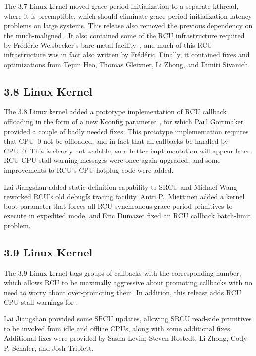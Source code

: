 The 3.7 Linux kernel moved grace-period initialization to a separate
kthread, where it is preemptible, which should eliminate
grace-period-initialization-latency problems on large systems.
This release also removed the previous  dependency
on the much-maligned .
It also contained some of the RCU infrastructure required by
Fr\'ed\'eric Weisbecker's  bare-metal
facility~\cite{JonCorbet2013NO-HZ-FULL}, and much of this RCU
infrastructure was in fact also written by Fr\'ed\'eric.
Finally, it contained fixes and optimizations from Tejun Heo,
Thomas Gleixner, Li Zhong, and Dimiti Sivanich.

\subsection{3.8 Linux Kernel}

The 3.8 Linux kernel added a prototype implementation of RCU callback
offloading in the form of a new  Kconfig
parameter~\cite{JonCorbet2012NOCB}, for which Paul Gortmaker provided
a couple of badly needed fixes.
This prototype implementation requires that CPU~0 not be offloaded,
and in fact that all callbacks be handled by CPU~0.
This is clearly not scalable, so a better implementation will appear later.
RCU CPU stall-warning messages were once again upgraded, and some
improvements to RCU's CPU-hotplug code were added.

Lai Jiangshan added static definition capability to SRCU and Michael
Wang reworked RCU's old debugfs tracing facility.
Antti P.~Miettinen added a kernel boot parameter that forces all RCU
synchronous grace-period primitives to execute in expedited mode,
and Eric Dumazet fixed an RCU callback batch-limit problem.

\subsection{3.9 Linux Kernel}

The 3.9 Linux kernel tags groups of callbacks with the corresponding
number, which allows RCU to be maximally aggressive about promoting
callbacks with no need to worry about over-promoting them.
In addition, this release adds RCU CPU stall warnings for .

Lai Jiangshan provided some SRCU updates, allowing SRCU read-side primitives
to be invoked from idle and offline CPUs, along with some additional
fixes.
Additional fixes were provided by Sasha Levin, Steven Rostedt,
Li Zhong, Cody P. Schafer, and Josh Triplett.

